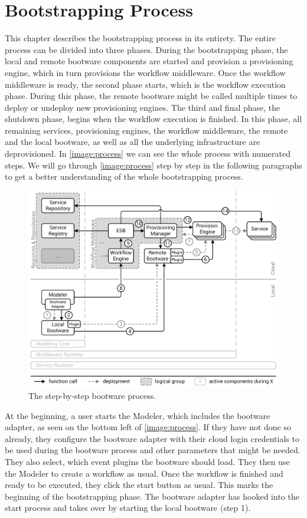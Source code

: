 \chapter{Bootstrapping Process}
\label{process}

This chapter describes the bootstrapping process in its entirety.
The entire process can be divided into three phases.
During the bootstrapping phase, the local and remote bootware components are started and provision a provisioning engine, which in turn provisions the workflow middleware.
Once the workflow middleware is ready, the second phase starts, which is the workflow execution phase.
During this phase, the remote bootware might be called multiple times to deploy or undeploy new provisioning engines.
The third and final phase, the shutdown phase, begins when the workflow execution is finished.
In this phase, all remaining services, provisioning engines, the workflow middleware, the remote and the local bootware, as well as all the underlying infrastructure are deprovisioned.
In \autoref{image:process} we can see the whole process with numerated steps.
We will go through \autoref{image:process} step by step in the following paragraphs to get a better understanding of the whole bootstrapping process.

\begin{figure}[!htbp]
	\centering
	\includegraphics[resolution=600]{process/assets/process}
	\caption{The step-by-step bootware process.}
	\label{image:process}
\end{figure}

At the beginning, a user starts the Modeler, which includes the bootware adapter, as seen on the bottom left of \autoref{image:process}.
If they have not done so already, they configure the bootware adapter with their cloud login credentials to be used during the bootware process and other parameters that might be needed. They also select, which event plugins the bootware should load.
They then use the Modeler to create a workflow as usual.
Once the workflow is finished and ready to be executed, they click the start button as usual.
This marks the beginning of the bootstrapping phase.
The bootware adapter has hooked into the start process and takes over by starting the local bootware (step 1).

